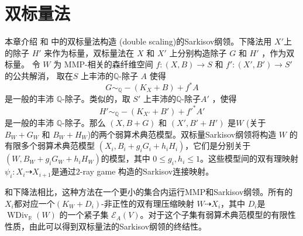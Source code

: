\chapter{双标量法}
 本章介绍\cite[\S 13]{haconMinimalModelProgram2012} 和  \cite{liuSarkisovProgramGeneralized2021}中的双标量法构造 (double scaling)的Sarkisov纲领。下降法用 $X'$上的除子 $H'$ 来作为标量，双标量法在  $X$ 和 $X'$ 上分别构造除子 $G$ 和 $H'$ ，作为双标量。
令 $W$ 为 MMP-相关的森纤维空间 $f:(X,B)\to S$ 和 $f':(X',B')\to S'$  的公共解消，  取在$ S $ 上丰沛的$\mathbb{Q}$-除子 $A$ 使得
\[G \sim_{\mathbb{Q}} -(K_{X}+B) +f^*A\]
是一般的丰沛 $\mathbb{Q}$-除子。类似的，取 $S'$ 上丰沛的$\mathbb{Q}$-除子$A'$ ，使得 
\[H' \sim_{\mathbb{Q}} -(K_{X'}+B') +f'^*A'\]
是一般的丰沛 $\mathbb{Q}$-除子。那么  $(X,B+G)$ 和 $(X',B'+H')$  是$W$ (关于 $B_{W}+G_{W}$ 和 $B_{W}+H_{W}$)的两个弱算术典范模型。双标量Sarkisov纲领将构造 $W$ 的有限多个弱算术典范模型 $(X_{i},B_{i}+g_{i}G_{i}+h_{i}H_{i})$，它们是分别关于 $(W,B_{W}+g_{i}G_{W}+h_{i}H_{W})$的模型，其中 $0\leqslant g_i,h_i\leqslant 1$。这些模型间的双有理映射 $\psi_{i}:X_{i}\dashrightarrow X_{i+1}$是通过$2$-ray game 构造的Sarkisov连接映射。

和下降法相比，这种方法在一个更小的集合内运行MMP和Sarkisov纲领。所有的 $X_{i}$都对应一个$(K_{W}+D_{i})$-非正性的双有理压缩映射 $W\dashrightarrow X_{i}$，其中 $D_{i}$是 $\operatorname{WDiv}_{\mathbb{R}}(W)$ 的一个紧子集 $\mathcal{E}_{A}(V)$。对于这个子集有弱算术典范模型的有限性性质，由此可以得到双标量法的Sarkisov纲领的终结性。
